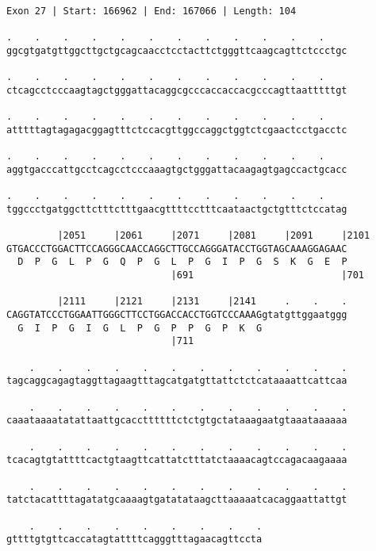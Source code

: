 \documentclass{article}
\begin{document}
\begin{Verbatim}
Exon 27 | Start: 166962 | End: 167066 | Length: 104
 
.    .    .    .    .    .    .    .    .    .    .    .    
ggcgtgatgttggcttgctgcagcaacctcctacttctgggttcaagcagttctccctgc
  
.    .    .    .    .    .    .    .    .    .    .    .    
ctcagcctcccaagtagctgggattacaggcgcccaccaccacgcccagttaatttttgt
  
.    .    .    .    .    .    .    .    .    .    .    .    
atttttagtagagacggagtttctccacgttggccaggctggtctcgaactcctgacctc
  
.    .    .    .    .    .    .    .    .    .    .    .    
aggtgacccattgcctcagcctcccaaagtgctgggattacaagagtgagccactgcacc
  
.    .    .    .    .    .    .    .    .    .    .    .    
tggccctgatggcttctttctttgaacgttttcctttcaataactgctgtttctccatag
  
         |2051     |2061     |2071     |2081     |2091     |2101
GTGACCCTGGACTTCCAGGGCAACCAGGCTTGCCAGGGATACCTGGTAGCAAAGGAGAAC
  D  P  G  L  P  G  Q  P  G  L  P  G  I  P  G  S  K  G  E  P
                             |691                          |701
  
         |2111     |2121     |2131     |2141     .    .    .
CAGGTATCCCTGGAATTGGGCTTCCTGGACCACCTGGTCCCAAAGgtatgttggaatggg
  G  I  P  G  I  G  L  P  G  P  P  G  P  K  G               
                             |711                           
  
    .    .    .    .    .    .    .    .    .    .    .    .
tagcaggcagagtaggttagaagtttagcatgatgttattctctcataaaattcattcaa
  
    .    .    .    .    .    .    .    .    .    .    .    .
caaataaaatatattaattgcaccttttttctctgtgctataaagaatgtaaataaaaaa
  
    .    .    .    .    .    .    .    .    .    .    .    .
tcacagtgtattttcactgtaagttcattatctttatctaaaacagtccagacaagaaaa
  
    .    .    .    .    .    .    .    .    .    .    .    .
tatctacattttagatatgcaaaagtgatatataagcttaaaaatcacaggaattattgt
  
    .    .    .    .    .    .    .    .    .
gttttgtgttcaccatagtattttcagggtttagaacagttccta
\end{Verbatim}
\newpage
\end{document}
